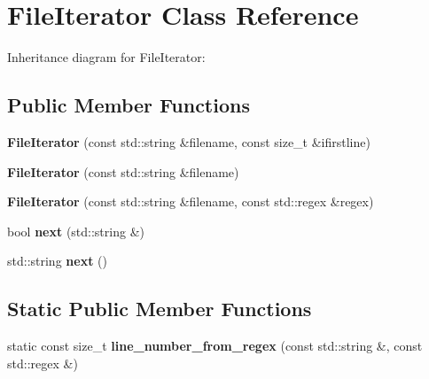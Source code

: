 \hypertarget{classFileIterator}{}\section{File\+Iterator Class Reference}
\label{classFileIterator}


Inheritance diagram for File\+Iterator\+:
\subsection*{Public Member Functions}
\begin{DoxyCompactItemize}
\item 
{\bfseries File\+Iterator} (const std\+::string \&filename, const size\+\_\+t \&ifirstline)\hypertarget{classFileIterator_a664201608652425655f7631194fc8a5f}{}\label{classFileIterator_a664201608652425655f7631194fc8a5f}

\item 
{\bfseries File\+Iterator} (const std\+::string \&filename)\hypertarget{classFileIterator_a72bdb8a60601e50cc74fa31a3031539e}{}\label{classFileIterator_a72bdb8a60601e50cc74fa31a3031539e}

\item 
{\bfseries File\+Iterator} (const std\+::string \&filename, const std\+::regex \&regex)\hypertarget{classFileIterator_ada8942b79a19dae2a0b668949ac08912}{}\label{classFileIterator_ada8942b79a19dae2a0b668949ac08912}

\item 
bool {\bfseries next} (std\+::string \&)\hypertarget{classFileIterator_a4d395f3fce39962f4a754868143fc318}{}\label{classFileIterator_a4d395f3fce39962f4a754868143fc318}

\item 
std\+::string {\bfseries next} ()\hypertarget{classFileIterator_ad362a010af079bcbfbccdfcc50488b0d}{}\label{classFileIterator_ad362a010af079bcbfbccdfcc50488b0d}

\end{DoxyCompactItemize}
\subsection*{Static Public Member Functions}
\begin{DoxyCompactItemize}
\item 
static const size\+\_\+t {\bfseries line\+\_\+number\+\_\+from\+\_\+regex} (const std\+::string \&, const std\+::regex \&)\hypertarget{classFileIterator_a2e1901e8154e12ea1e103989962b238c}{}\label{classFileIterator_a2e1901e8154e12ea1e103989962b238c}

\end{DoxyCompactItemize}
